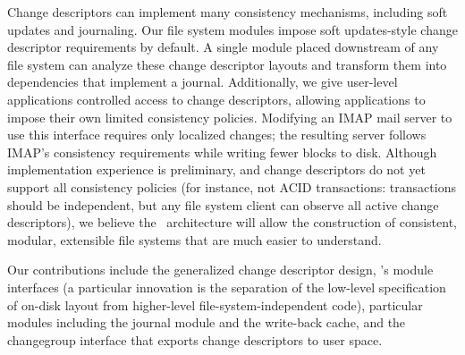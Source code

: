 Change descriptors can implement many consistency mechanisms, including
 soft updates and journaling.
%
Our file system modules impose soft updates-style change descriptor
 requirements by default.
%
A single module placed downstream of any file system can analyze these
 change descriptor layouts and transform them into dependencies that
 implement a journal.
%
Additionally, we give user-level applications controlled access to change
 descriptors, allowing applications to impose their own limited consistency
 policies.
%
Modifying an IMAP mail server to use this interface requires only localized
 changes; the resulting server follows IMAP's consistency
 requirements while writing fewer blocks to disk.
%
Although implementation experience is preliminary, and change descriptors
 do not yet support all consistency policies (for instance, not ACID
 transactions: transactions should be independent, but any file system
 client can observe all active change descriptors), we believe the \Kudos\
 architecture will allow the construction of consistent, modular,
 extensible file systems that are much easier to understand.



Our contributions include the generalized change descriptor design,
 \Kudos's module interfaces (a particular innovation is the separation of
 the low-level specification of on-disk layout from higher-level
 file-system-independent code), particular modules including the journal
 module and the write-back cache, and the changegroup interface that
 exports change descriptors to user space.


\begin{comment}
 The rest of this 
 A particular innovation of the
 \module\ design is the separation of the low-level specification of on-disk
 layout from higher-level file system-independent code, which operates on
 abstract disk structures.
 Our journaling \module\ can automatically add
 journaling to any file system, and combinations of simple \modules\ can support,
 for example, correct consistency on RAID over loop-back devices.
\end{comment}




